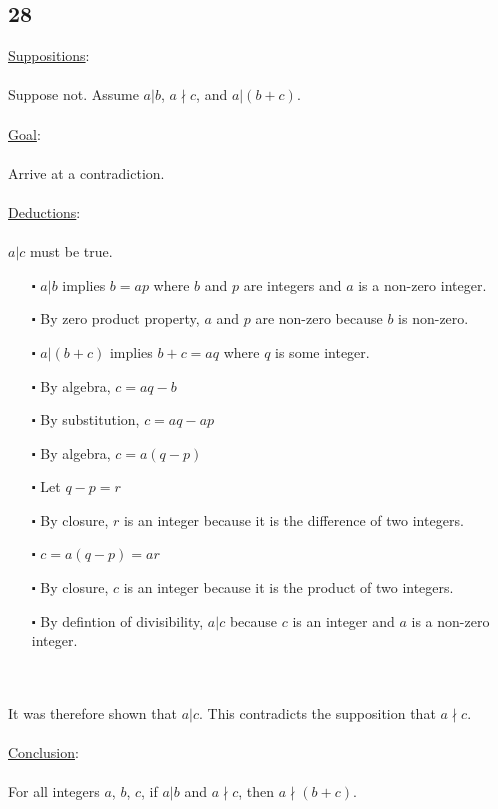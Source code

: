 \documentclass[12pt]{article}
\begin{document}
\subsection*{28}
\underline{Suppositions}:
\\ \\
Suppose not. Assume $a|b$, $a \nmid c$, and $a |(b+c)$.
\\ \\
\underline{Goal}:
\\ \\
Arrive at a contradiction.
\\ \\
\underline{Deductions}:
\\ \\
$a|c$ must be true.
\begin{itemize}
  \item [$\centerdot$] $a|b$ implies $b = ap$ where $b$ and $p$ are integers and $a$ is a non-zero integer.
  \item [$\centerdot$] By zero product property, $a$ and $p$ are non-zero because $b$ is non-zero.
  \item [$\centerdot$] $a|(b+c)$ implies $b+c = aq$ where $q$ is some integer.
  \item [$\centerdot$] By algebra, $c = aq -b$
  \item [$\centerdot$] By substitution, $c = aq - ap$
  \item [$\centerdot$] By algebra, $c = a(q-p)$
  \item [$\centerdot$] Let $q-p = r$
  \item [$\centerdot$] By closure, $r$ is an integer because it is the difference of two integers.
  \item [$\centerdot$] $c = a(q-p) = ar$
  \item [$\centerdot$] By closure, $c$ is an integer because it is the product of two integers.
  \item [$\centerdot$] By defintion of divisibility, $a|c$ because $c$ is an integer and $a$ is a non-zero integer.
\end{itemize}
\newblock
\\ \\
It was therefore shown that $a | c$. This contradicts the supposition that $a \nmid c$.
\\ \\
\underline{Conclusion}:
\\ \\
For all integers $a$, $b$, $c$, if $a|b$ and $a \nmid c$, then $a \nmid (b+c)$.
\end{document}
